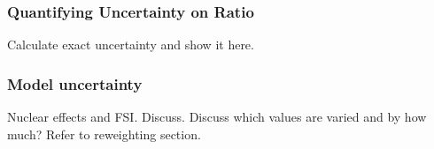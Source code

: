   \subsubsection{Quantifying Uncertainty on Ratio}\label{errorcalc}
    Calculate exact uncertainty and show it here.
  \subsubsection{Model uncertainty}\label{sec:modeluncertainty}
    Nuclear effects and FSI. Discuss. Discuss which values are varied and by
    how much? Refer to reweighting section. 

